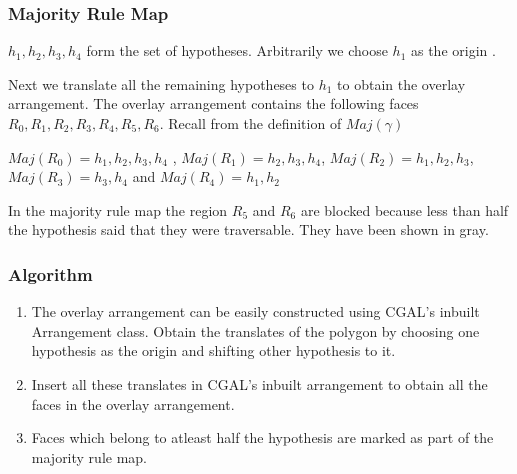 \documentclass{beamer}
\begin{document}
\frame
{
\frametitle{Majority Rule Map}

${h_{1},h_{2},h_{3},h_{4}}$ form the set of hypotheses. 
Arbitrarily we choose $h_{1}$ as the origin \vspace{0.1in}.

Next we translate all the remaining hypotheses to $h_{1}$ to obtain the overlay arrangement. The overlay arrangement contains the following faces
$R_{0},R_{1},R_{2},R_{3},R_{4},R_{5},R_{6}$. Recall from the definition of $Maj(\gamma)$

\vspace{0.1in}
$  Maj(R_{0})  =  {h_{1}, h_{2}, h_{3}, h_{4}} $ , $  Maj(R_{1})  =  { h_{2}, h_{3}, h_{4}} $, $ Maj(R_{2})  =  {h_{1}, h_{2}, h_{3}} $,
$  Maj(R_{3})  =  {h_{3}, h_{4}} $ and $  Maj(R_{4})  =  {h_{1}, h_{2}} $ \\
\vspace{0.1in}

In the majority rule map the region $R_{5}$ and $R_{6}$ are blocked because less than half the hypothesis said that they were
 traversable. They have been shown in gray.
}

\frame
{
\frametitle{Algorithm}
\begin{enumerate}
\item
The overlay arrangement can be easily constructed using CGAL's inbuilt Arrangement class. Obtain the translates of the polygon by 
choosing one hypothesis as the origin and shifting other hypothesis to it.
\item
Insert all these translates in CGAL's inbuilt arrangement to obtain all the faces in the overlay arrangement.
\item
Faces which belong to atleast half the hypothesis are marked as part of the majority rule map.
\end{enumerate}

}
\end{document}
